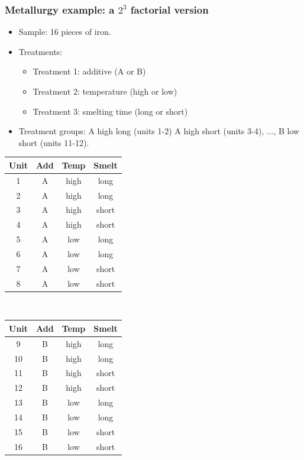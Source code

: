 \documentclass[handout]{beamer}\usepackage{graphicx, color}
\numberwithin{equation}{section}
\begin{document}
\begin{frame}
\frametitle{Metallurgy example: a $2^3$ factorial version} \scriptsize

\begin{itemize}
 \item Sample: 16 pieces of iron.
\pause \item Treatments:
\begin{itemize}
 \item Treatment 1: additive (A or B)
\pause \item Treatment 2: temperature (high or low)
\pause \item Treatment 3: smelting time (long or short)
\end{itemize}
\pause \item Treatment groups: A high long (units 1-2) A high short (units 3-4), $\ldots$, B low short (units 11-12).
\end{itemize}

\begin{center}
\begin{tabular}{c|c|c|c}
Unit & Add & Temp & Smelt \\ \hline
1 & A & high & long \\ 
2 & A & high & long \\ 
3 & A & high & short \\ 
4 & A & high & short \\ 
5 & A & low & long \\ 
6 & A & low & long\\ 
7 & A & low & short \\ 
8 & A & low & short \\ 
\end{tabular}$\quad$ \begin{tabular}{c|c|c|c}
Unit & Add & Temp & Smelt \\ \hline
9 & B & high & long \\ 
10 & B & high & long \\ 
11 & B & high & short \\ 
12 & B & high & short \\ 
13 & B & low & long \\ 
14 & B & low & long \\ 
15 & B & low & short \\ 
16 & B & low & short \\ 
\end{tabular}
\end{center}
\end{frame}
\end{document}
